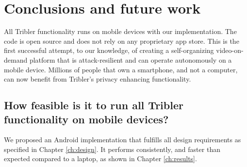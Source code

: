 \chapter{Conclusions and future work}\label{ch:conclusions}

All Tribler functionality runs on mobile devices with our implementation.
The code is open source \cite{tribler_brussee} and does not rely on any proprietary app store.
This is the first successful attempt, to our knowledge, of creating a self-organizing video-on-demand platform that is attack-resilient and can operate autonomously on a mobile device.
Millions of people that own a smartphone, and not a computer, can now benefit from Tribler's privacy enhancing functionality.


\section{How feasible is it to run all Tribler functionality on mobile devices?} %
We proposed an Android implementation that fulfills all design requirements as specified in Chapter \ref{ch:design}.
It performs consistently, and faster than expected compared to a laptop, as shown in Chapter \ref{ch:results}.

